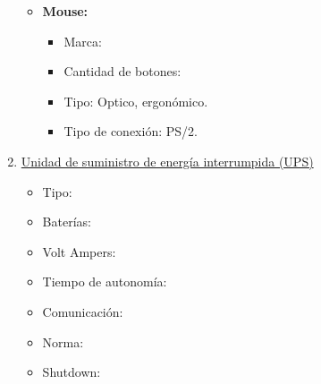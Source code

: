 \begin{enumerate}
\begin{itemize}
    \item \textbf{Mouse:}
    \begin{itemize}
      \item Marca:
      \item Cantidad de botones:
      \item Tipo: Optico, ergonómico.
      \item Tipo de conexión: PS/2.
    \end{itemize}
  \end{itemize}
  
  \item \underline{Unidad de suministro de energía interrumpida (UPS)}
  \begin{itemize}
    \item Tipo:
    \item Baterías:
    \item Volt Ampers:
    \item Tiempo de autonomía:
    \item Comunicación:
    \item Norma:
    \item Shutdown:
  \end{itemize}
      
\end{enumerate}
